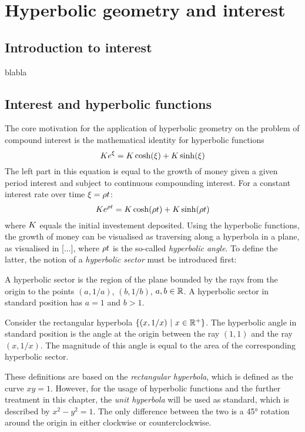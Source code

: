 \chapter{Hyperbolic geometry and interest}

\section{Introduction to interest}
blabla

\section{Interest and hyperbolic functions}
The core motivation for the application of hyperbolic geometry on the problem of compound interest is the mathematical identity for hyperbolic functions
\begin{equation}
    K e^{\xi} = K\cosh(\xi) + K\sinh(\xi)
    \label{eq:sinhcosh}
\end{equation}
The left part in this equation is equal to the growth of money given a given period interest \han and subject to continuous compounding interest. For a constant interest rate over time $\xi = \rho t$:
\begin{equation}
    K e^{\rho t} = K\cosh(\rho t) + K\sinh(\rho t)
\end{equation}
where $K$ equals the initial investement deposited. Using the hyperbolic functions, the growth of money can be visualised as traversing along a hyperbola in a plane, as visualised in [...], where $\rho t$ is the so-called \textit{hyperbolic angle}. To define the latter, the notion of a \textit{hyperbolic sector} must be introduced first:

\begin{definition}
    A hyperbolic sector is the region of the plane bounded by the rays from the origin to the points $(a, 1/a)$, $(b, 1/b)$, $a, b \in \mathbb{R}$. A hyperbolic sector in standard position has $a = 1$ and $b > 1$. 
    
\end{definition}

\begin{definition}
    Consider the rectangular hyperbola $\{(x, 1/x)\ \vert\ x \in \mathbb{R}^+\}$. The hyperbolic angle in standard position is the angle at the origin between the ray $(1, 1)$ and the ray $(x, 1/x)$. The magnitude of this angle is equal to the area of the corresponding hyperbolic sector.
\end{definition}
These definitions are based on the \textit{rectangular hyperbola}, which is defined as the curve $xy = 1$. However, for the usage of hyperbolic functions and the further treatment in this chapter, the \textit{unit hyperbola} will be used as standard, which is described by $x^2 - y^2 = 1$. The only difference between the two is a \ang{45} rotation around the origin in either clockwise or counterclockwise. 

